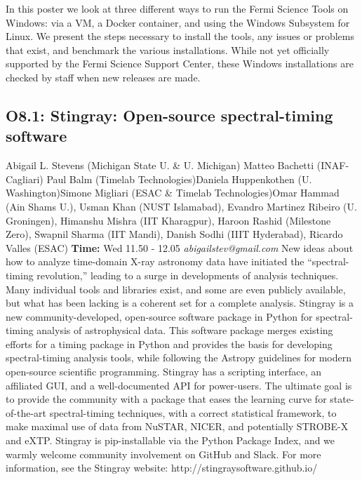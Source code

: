 \documentclass{report}
\begin{document}
In this poster we look at three different ways to run the Fermi Science Tools on Windows: via a VM, a Docker container, and using the Windows Subsystem for Linux.  We present the steps necessary to install the tools, any issues or problems that exist, and benchmark the various installations.  While not yet officially supported by the Fermi Science Support Center, these Windows installations are checked by staff when new releases are made.\newline
\newpage
\subsection*{O8.1: Stingray: Open-source spectral-timing software}
\bigskip
Abigail L. Stevens (Michigan State U. \& U. Michigan) \newline Matteo Bachetti (INAF-Cagliari) \newline  Paul Balm (Timelab Technologies)\newline  Daniela Huppenkothen (U. Washington)\newline Simone Migliari (ESAC \& Timelab Technologies)\newline  Omar Hammad (Ain Shams U.), Usman Khan (NUST Islamabad), Evandro Martinez Ribeiro (U. Groningen), Himanshu Mishra (IIT Kharagpur), Haroon Rashid (Milestone Zero), Swapnil Sharma (IIT Mandi), Danish Sodhi (IIIT Hyderabad), Ricardo Valles (ESAC)\newline\newline
{\bf Time:} Wed 11.50 - 12.05\newline
\newline
{\it abigailstev@gmail.com}\newline
\newline\newline
New ideas about how to analyze time-domain X-ray astronomy data have initiated the “spectral-timing revolution,” leading to a surge in developments of analysis techniques. Many individual tools and libraries exist, and some are even publicly available, but what has been lacking is a coherent set for a complete analysis. Stingray is a new community-developed, open-source software package in Python for spectral-timing analysis of astrophysical data. This software package merges existing efforts for a timing package in Python and provides the basis for developing spectral-timing analysis tools, while following the Astropy guidelines for modern open-source scientific programming. Stingray has a scripting interface, an affiliated GUI, and a well-documented API for power-users. The ultimate goal is to provide the community with a package that eases the learning curve for state-of-the-art spectral-timing techniques, with a correct statistical framework, to make maximal use of data from NuSTAR, NICER, and potentially STROBE-X and eXTP. Stingray is pip-installable via the Python Package Index, and we warmly welcome community involvement on GitHub and Slack. For more information, see the Stingray website: http://stingraysoftware.github.io/\newline
\newpage
\end{document}
